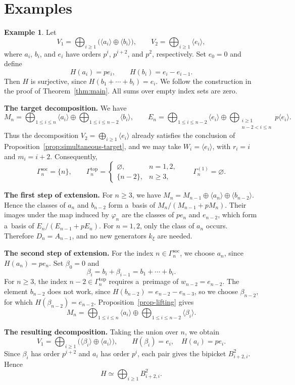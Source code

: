 \documentclass[11pt]{article}
\theoremstyle{definition}
\newtheorem{ex}[thm]{Example}
\begin{document}
\section{Examples}

\begin{ex}
	Let
	\[
	V_1=\bigoplus_{i\geq1}
	\bigl(\langle a_i\rangle\oplus\langle b_i\rangle\bigr),
	\qquad
	V_2=\bigoplus_{i\geq1}\langle e_i\rangle,
	\]
	where $a_i$, $b_i$, and $e_i$ have orders $p^i$, $p^{i+2}$,
	and $p^2$, respectively. Set $e_0=0$ and define
	\[
	H(a_i)=pe_i,\qquad H(b_i)=e_i-e_{i-1}.
	\]
	Then $H$ is surjective, since $H(b_1+\cdots+b_i)=e_i$.
	We follow the construction in the proof of
	Theorem~\ref{thm:main}. All sums over empty index sets are zero.
	
	\medskip
	\noindent\textbf{The target decomposition.}
	We have
	\[
	M_n=
	\bigoplus_{1\leq i\leq n}\langle a_i\rangle
	\oplus
	\bigoplus_{1\leq i\leq n-2}\langle b_i\rangle,
	\qquad
	E_n=
	\bigoplus_{1\leq i\leq n-2}\langle e_i\rangle
	\oplus
	\bigoplus_{\substack{i\geq1\\n-2<i\leq n}}p\langle e_i\rangle.
	\]
		Thus the decomposition $V_2=\bigoplus_{i\geq1}\langle e_i\rangle$ already satisfies the
	conclusion of Proposition~\ref{prop:simultaneous-target}, and we may take
	$W_i=\langle e_i\rangle$, with $r_i=i$ and $m_i=i+2$. Consequently,
	\[
	\Gamma_n^{\mathrm{soc}}=\{n\},\qquad
	\Gamma_n^{\mathrm{top}}=
	\begin{cases}
		\varnothing,&n=1,2,\\
		\{n-2\},&n\geq3,
	\end{cases}
	\qquad
	\Gamma_n^{(1)}=\varnothing.
	\]
	
	\medskip
	\noindent\textbf{The first step of extension.}
	For $n\geq3$, we have
	$M_n=M_{n-1}\oplus\langle a_n\rangle
	\oplus\langle b_{n-2}\rangle$.
	Hence the classes of $a_n$ and $b_{n-2}$ form a~basis of
	$M_n/(M_{n-1}+pM_n)$. Their images under the map induced by
	$\varphi_n$ are the classes of $pe_n$ and $e_{n-2}$,
	which form a~basis of $E_n/(E_{n-1}+pE_n)$.
	For $n=1,2$, only the class of $a_n$ occurs.
	Therefore $D_n=A_{n-1}$, and no new generators $k_\xi$
	are needed.
	
	\medskip
	\noindent\textbf{The second step of extension.}
	For the index $n\in\Gamma_n^{\mathrm{soc}}$, we choose $a_n$,
	since $H(a_n)=pe_n$.
	Set $\beta_0=0$ and
	\[
	\beta_i=b_i+\beta_{i-1}=b_1+\cdots+b_i.
	\]
For $n\geq3$, the index $n-2\in\Gamma_n^{\mathrm{top}}$
		requires a~preimage of $w_{n-2}=e_{n-2}$. The element $b_{n-2}$ does not work, since
		$H(b_{n-2})=e_{n-2}-e_{n-3}$, so we choose $\beta_{n-2}$, for which
		$H(\beta_{n-2})=e_{n-2}$. Proposition~\ref{prop-lifting} gives
	\[
	M_n=
	\bigoplus_{1\leq i\leq n}\langle a_i\rangle
	\oplus
	\bigoplus_{1\leq i\leq n-2}\langle\beta_i\rangle.
	\]
	
	\medskip
	\noindent\textbf{The resulting decomposition.}
	Taking the union over $n$, we obtain
	\[
	V_1=\bigoplus_{i\geq1}
	\bigl(\langle\beta_i\rangle\oplus\langle a_i\rangle\bigr),
	\qquad
	H(\beta_i)=e_i,\quad H(a_i)=pe_i.
	\]
	Since $\beta_i$ has order $p^{i+2}$ and $a_i$ has order $p^i$,
	each pair gives the bipicket $B_{i+2,i}^2$. Hence
	\[
	H\simeq\bigoplus_{i\geq1}B_{i+2,i}^2.
	\]
\end{ex}
\end{document}
